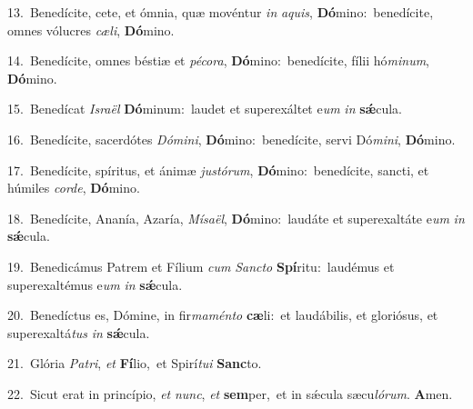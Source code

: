 {\numbfont\textcolor{\numbcolor}{13.}}~Benedícite, cete, et ómnia, quæ movéntur \textit{in} \textit{a}\-\textit{quis}, \textbf{Dó}\-mino:~\star benedícite, omnes vólucres \textit{cæ}\-\textit{li}, \textbf{Dó}\-mino.\par
{\numbfont\textcolor{\numbcolor}{14.}}~Benedícite, omnes béstiæ et \textit{pé}\-\textit{co}\textit{ra}, \textbf{Dó}\-mino:~\star benedícite, fílii hó\-\textit{mi}\-\textit{num}, \textbf{Dó}\-mino.\par
{\numbfont\textcolor{\numbcolor}{15.}}~Benedícat \textit{Is}\-\textit{ra}\textit{ël} \textbf{Dó}\-minum:~\star laudet et superexáltet e\textit{um} \textit{in} \textbf{sǽ}\-cula.\par
{\numbfont\textcolor{\numbcolor}{16.}}~Benedícite, sacerdótes \textit{Dó}\-\textit{mi}\textit{ni}, \textbf{Dó}\-mino:~\star benedícite, servi Dó\-\textit{mi}\-\textit{ni}, \textbf{Dó}\-mino.\par
{\numbfont\textcolor{\numbcolor}{17.}}~Benedícite, spíritus, et ánimæ \textit{jus}\-\textit{tó}\textit{rum}, \textbf{Dó}\-mino:~\star benedícite, sancti, et húmiles \textit{cor}\-\textit{de}, \textbf{Dó}\-mino.\par
{\numbfont\textcolor{\numbcolor}{18.}}~Benedícite, Ananía, Azaría, \textit{Mí}\-\textit{sa}\textit{ël}, \textbf{Dó}\-mino:~\star laudáte et superexaltáte e\textit{um} \textit{in} \textbf{sǽ}\-cula.\par
{\numbfont\textcolor{\numbcolor}{19.}}~Benedicámus Patrem et Fílium \textit{cum} \textit{Sanc}\-\textit{to} \textbf{Spí}\-ritu:~\star laudémus et superexaltémus e\textit{um} \textit{in} \textbf{sǽ}\-cula.\par
{\numbfont\textcolor{\numbcolor}{20.}}~Benedíctus es, Dómine, in fir\-\textit{ma}\-\textit{mén}\textit{to} \textbf{cæ}\-li:~\star et laudábilis, et gloriósus, et superexaltá\textit{tus} \textit{in} \textbf{sǽ}\-cula.\par
{\numbfont\textcolor{\numbcolor}{21.}}~Glória \textit{Pa}\-\textit{tri}, \textit{et} \textbf{Fí}\-lio,~\star et Spirí\-\textit{tu}\-\textit{i} \textbf{Sanc}\-to.\par
{\numbfont\textcolor{\numbcolor}{22.}}~Sicut erat in princípio, \textit{et} \textit{nunc}\-, \textit{et} \textbf{sem}\-per,~\star et in sǽcula sæcu\-\textit{ló}\-\textit{rum}. \textbf{A}\-men.\par
